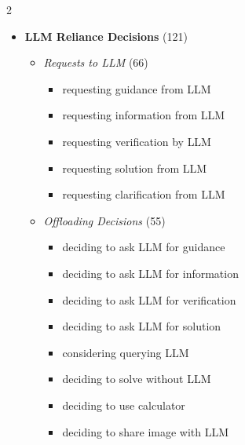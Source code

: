 \begin{multicols}{2}
\begin{itemize}[leftmargin=*, itemsep=2pt, topsep=0pt]
        \item \textbf{\ac{LLM} Reliance Decisions} (121)
        \begin{itemize}[leftmargin=*, nosep]
            \item \textit{Requests to \ac{LLM}} (66)
            \begin{itemize}[leftmargin=*, nosep]
                \item requesting guidance from \ac{LLM}
                \item requesting information from \ac{LLM}
                \item requesting verification by \ac{LLM}
                \item requesting solution from \ac{LLM}
                \item requesting clarification from \ac{LLM}
            \end{itemize}
            \item \textit{Offloading Decisions} (55)
            \begin{itemize}[leftmargin=*, nosep]
                \item deciding to ask \ac{LLM} for guidance
                \item deciding to ask \ac{LLM} for information
                \item deciding to ask \ac{LLM} for verification
                \item deciding to ask \ac{LLM} for solution
                \item considering querying \ac{LLM}
                \item deciding to solve without \ac{LLM}
                \item deciding to use calculator
                \item deciding to share image with \ac{LLM}
            \end{itemize}
        \end{itemize}


\end{itemize}
\end{multicols}
